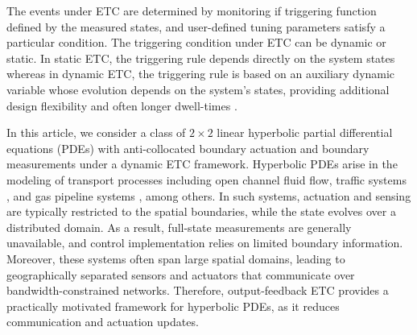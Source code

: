 \documentclass[letterpaper, 10 pt, conference]{ieeeconf}
\begin{document}
The events under ETC are determined by monitoring if triggering function defined by the measured states, and user-defined tuning parameters satisfy a particular condition. The triggering condition under ETC can be dynamic or static. In static ETC, the triggering rule depends directly on the system states whereas in dynamic ETC, the triggering rule is based on an auxiliary dynamic variable whose evolution depends on the system's states, providing additional design flexibility and often longer dwell-times \cite{girard2015dynamic}. 

In this article, we consider a class of $2\times2$ linear hyperbolic partial differential equations (PDEs) with anti-collocated boundary actuation and  boundary measurements under a dynamic ETC framework. Hyperbolic PDEs arise in the modeling of transport processes including open channel fluid flow\cite{coron2007,litrico2009,diagne2017backstepping,somathilake2025_etc,somathilake2024_sediment}, traffic systems \cite{yu2019traffic}, and gas pipeline systems  \cite{bhathiya2025_gas}, among others. In such systems, actuation and sensing are typically restricted to the spatial boundaries, while the state evolves over a distributed domain. As a result, full-state measurements are generally unavailable, and control implementation relies on limited boundary information. Moreover, these systems often span large spatial domains, leading to geographically separated sensors and actuators that communicate over bandwidth-constrained networks. Therefore, output-feedback ETC provides a practically motivated framework for hyperbolic PDEs, as it reduces communication and actuation updates.
\end{document}
